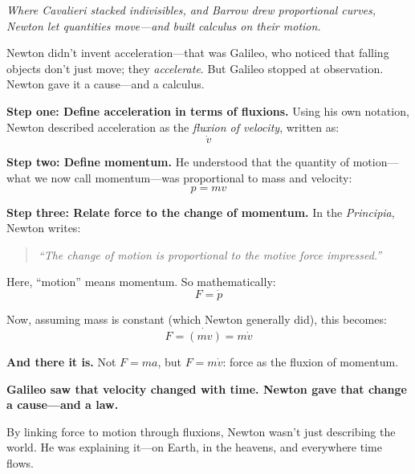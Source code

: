 \textit{Where Cavalieri stacked indivisibles, and Barrow drew proportional curves, Newton let quantities move—and built calculus on their motion.}
\begin{tcolorbox}[colback=gray!5!white, colframe=black, 
  title={Historical Sidebar: How Newton Got to \( F = m\dot{v} \)}, 
  fonttitle=\bfseries, arc=1.5mm, boxrule=0.4pt]
  
  Newton didn’t invent acceleration—that was Galileo, who noticed that falling objects don’t just move; they \textit{accelerate}. But Galileo stopped at observation. Newton gave it a cause—and a calculus.
  
  \medskip
  
  \textbf{Step one: Define acceleration in terms of fluxions.}  
  Using his own notation, Newton described acceleration as the \textit{fluxion of velocity}, written as:
  \[
  \dot{v}
  \]
  
  \textbf{Step two: Define momentum.}  
  He understood that the quantity of motion—what we now call momentum—was proportional to mass and velocity:
  \[
  p = m v
  \]
  
  \textbf{Step three: Relate force to the change of momentum.}  
  In the \textit{Principia}, Newton writes:
  \begin{quote}
  \textit{“The change of motion is proportional to the motive force impressed.”}
  \end{quote}
  Here, “motion” means momentum. So mathematically:
  \[
  F = \dot{p}
  \]
  
  Now, assuming mass is constant (which Newton generally did), this becomes:
  \[
  F = \dot{(mv)} = m\dot{v}
  \]
  
  \textbf{And there it is.} Not \( F = ma \), but \( F = m\dot{v} \): force as the fluxion of momentum.
  
  \medskip
  
  \textbf{Galileo saw that velocity changed with time. Newton gave that change a cause—and a law.}
  
  By linking force to motion through fluxions, Newton wasn’t just describing the world. He was explaining it—on Earth, in the heavens, and everywhere time flows.
  \end{tcolorbox}
  


